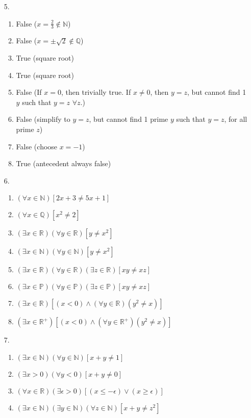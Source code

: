 \documentclass[11pt]{exam}
\begin{document}
\begin{enumerate}[leftmargin=0pt]
\item[5.]
\begin{enumerate}[label=(\alph*)]
    \item False ($x = \frac{2}{3} \notin \mathbb{N}$)
    \item False ($x = \pm \sqrt{2} \notin \mathbb{Q}$)
    \item True (square root)
    \item True (square root)
    \item False (If $x = 0$, then trivially true. If $x \neq 0$, then $y = z$, but cannot find 1 $y$ such that $y = z$ $\forall z$.)
    \item False (simplify to $y = z$, but cannot find 1 prime $y$ such that $y = z$, for all prime $z$)
    \item False (choose $x = -1$)
    \item True (antecedent always false)
\end{enumerate}

\item[6.]
\begin{enumerate}[label=(\alph*)]
    \item $(\forall x \in \mathbb{N}) [2x + 3 \neq 5x + 1]$
    \item $(\forall x \in \mathbb{Q}) [x^2 \neq 2]$
    \item $(\exists x \in \mathbb{R})(\forall y \in \mathbb{R})[y \neq x^2]$
    \item $(\exists x \in \mathbb{N})(\forall y \in \mathbb{N})[y \neq x^2]$
    \item $(\exists x \in \mathbb{R})(\forall y \in \mathbb{R})( \exists z \in \mathbb{R})[xy \neq xz]$
    \item $(\exists x \in \mathbb{P})(\forall y \in \mathbb{P})(\exists z \in \mathbb{P})[xy \neq xz]$
    \item $(\exists x \in \mathbb{R})[(x < 0) \land (\forall y \in \mathbb{R})(y^2 \neq x)]$
    \item $(\exists x \in \mathbb{R}^{+})[(x < 0) \land (\forall y \in \mathbb{R}^{+})(y^2 \neq x)]$
\end{enumerate}

\item[7.]
\begin{enumerate}[label=(\alph*)]
    \item $(\exists x \in \mathbb{N})(\forall y \in \mathbb{N})[x + y \neq 1]$
    \item $(\exists x > 0)(\forall y < 0)[x + y \neq 0]$
    \item $(\forall x \in \mathbb{R})(\exists \epsilon > 0)[(x \leq -\epsilon) \lor (x \geq \epsilon)]$
    \item $(\exists x \in \mathbb{N})(\exists y \in \mathbb{N})(\forall z \in \mathbb{N})[x + y \neq z^2]$
\end{enumerate}


\end{enumerate}
\end{document}
